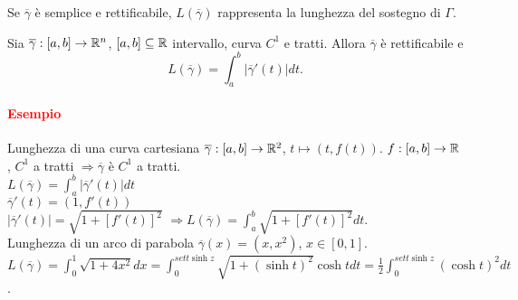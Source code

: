 \begin{attbar}
	Se $\overline{\gamma}$ è semplice e rettificabile, $L(\overline{\gamma})$ rappresenta la lunghezza del sostegno di $\Gamma$.
\end{attbar}


\begin{theorem}
	Sia $\overline{\gamma}:[a,b]\rightarrow \mathbb{R}^n$, $[a,b] \subseteq \mathbb{R}$ intervallo, curva $C^1$ e tratti. Allora $\overline{\gamma}$ è rettificabile e 
	\begin{equation*}
		L(\overline{\gamma})=\int_{a}^{b}|\overline{\gamma}'(t)|dt.
	\end{equation*}
	\paragraph{\textcolor{red}{Esempio}}
	Lunghezza di una curva cartesiana $\overline{\gamma}:[a,b]\rightarrow \mathbb{R}^2$, $t \mapsto (t,f(t))$. $f:[a,b]\rightarrow \mathbb{R}$, $C^1$ a tratti $\Rightarrow \overline{\gamma}$ è $C^1$ a tratti.\\
	$L(\overline{\gamma})=\int_a^b|\overline{\gamma}'(t)|dt$\\
	$\overline{\gamma}'(t)=(1,f'(t))$\\
	$|\overline{\gamma}'(t)|=\sqrt{1+[f'(t)]^2}$
	$\Rightarrow L(\overline{\gamma})=\int_a^b\sqrt{1+[f'(t)]^2}dt$.\\
	Lunghezza di un arco di parabola $\overline{\gamma}(x)=(x,x^2)$, $x \in [0,1]$.\\
	$L(\overline{\gamma})=\int_0^1\sqrt{1+4x^2}dx= \int_0^{sett \sinh z} \sqrt{1+(\sinh t)^2}\cosh t dt= \frac{1}{2}\int_0^{sett \sinh z}(\cosh t)^2dt$.
\end{theorem}


